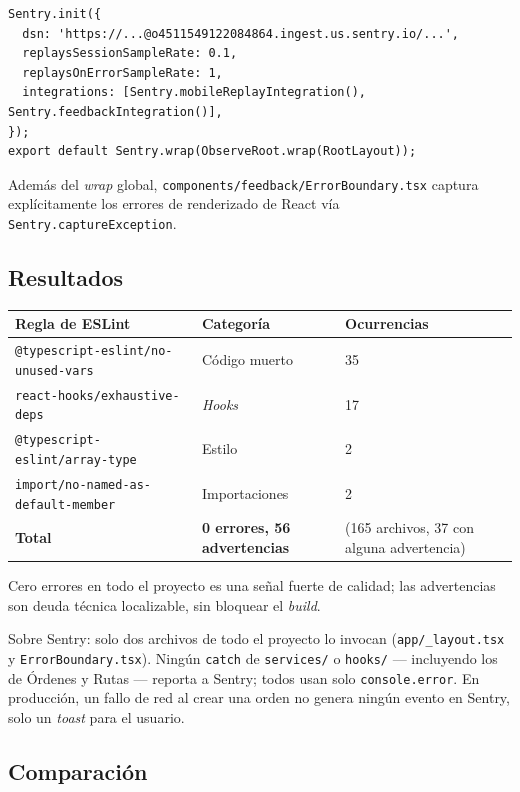 \documentclass[11pt,a4paper]{article}
\begin{document}
\begin{lstlisting}[caption={Inicialización de Sentry (\texttt{app/\_layout.tsx})}]
Sentry.init({
  dsn: 'https://...@o4511549122084864.ingest.us.sentry.io/...',
  replaysSessionSampleRate: 0.1,
  replaysOnErrorSampleRate: 1,
  integrations: [Sentry.mobileReplayIntegration(), Sentry.feedbackIntegration()],
});
export default Sentry.wrap(ObserveRoot.wrap(RootLayout));
\end{lstlisting}

Además del \textit{wrap} global, \texttt{components/feedback/ErrorBoundary.tsx} captura
explícitamente los errores de renderizado de React vía \texttt{Sentry.captureException}.

\subsection{Resultados}

\begin{longtable}{p{6.5cm} p{3cm} p{3cm}}
\toprule
\textbf{Regla de ESLint} & \textbf{Categoría} & \textbf{Ocurrencias} \\
\midrule
\endhead
\texttt{@typescript-eslint/no-unused-vars} & Código muerto & 35 \\
\texttt{react-hooks/exhaustive-deps} & \textit{Hooks} & 17 \\
\texttt{@typescript-eslint/array-type} & Estilo & 2 \\
\texttt{import/no-named-as-default-member} & Importaciones & 2 \\
\midrule
\textbf{Total} & \textbf{0 errores, 56 advertencias} & (165 archivos, 37 con alguna advertencia) \\
\bottomrule
\end{longtable}

Cero errores en todo el proyecto es una señal fuerte de calidad; las advertencias son deuda
técnica localizable, sin bloquear el \textit{build}.

Sobre Sentry: solo dos archivos de todo el proyecto lo invocan (\texttt{app/\_layout.tsx} y
\texttt{ErrorBoundary.tsx}). Ningún \texttt{catch} de \texttt{services/} o \texttt{hooks/}
--- incluyendo los de Órdenes y Rutas --- reporta a Sentry; todos usan solo
\texttt{console.error}. En producción, un fallo de red al crear una orden no genera ningún
evento en Sentry, solo un \textit{toast} para el usuario.

\subsection{Comparación}
\label{sec:comparacion}
\end{document}
